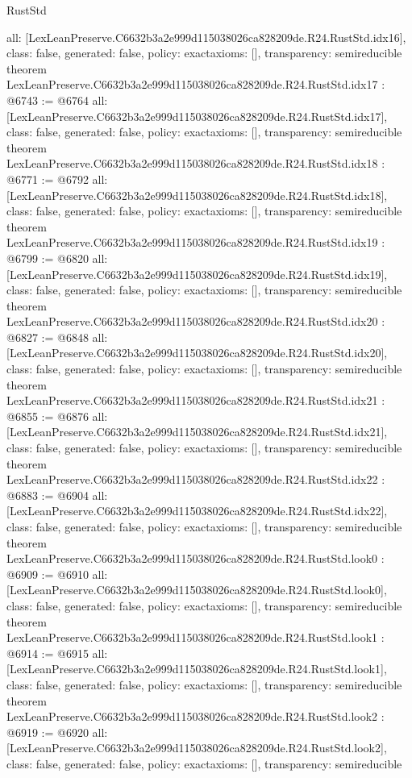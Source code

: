 \begin{lexlean}{RustStd}
\begin{coremodule}
{  all: [LexLeanPreserve.C6632b3a2e999d115038026ca828209de.R24.RustStd.idx16],
  class: false,
  generated: false,
  policy: exact{axioms: []},
  transparency: semireducible
}
theorem LexLeanPreserve.C6632b3a2e999d115038026ca828209de.R24.RustStd.idx17 : @6743 := @6764 {
  all: [LexLeanPreserve.C6632b3a2e999d115038026ca828209de.R24.RustStd.idx17],
  class: false,
  generated: false,
  policy: exact{axioms: []},
  transparency: semireducible
}
theorem LexLeanPreserve.C6632b3a2e999d115038026ca828209de.R24.RustStd.idx18 : @6771 := @6792 {
  all: [LexLeanPreserve.C6632b3a2e999d115038026ca828209de.R24.RustStd.idx18],
  class: false,
  generated: false,
  policy: exact{axioms: []},
  transparency: semireducible
}
theorem LexLeanPreserve.C6632b3a2e999d115038026ca828209de.R24.RustStd.idx19 : @6799 := @6820 {
  all: [LexLeanPreserve.C6632b3a2e999d115038026ca828209de.R24.RustStd.idx19],
  class: false,
  generated: false,
  policy: exact{axioms: []},
  transparency: semireducible
}
theorem LexLeanPreserve.C6632b3a2e999d115038026ca828209de.R24.RustStd.idx20 : @6827 := @6848 {
  all: [LexLeanPreserve.C6632b3a2e999d115038026ca828209de.R24.RustStd.idx20],
  class: false,
  generated: false,
  policy: exact{axioms: []},
  transparency: semireducible
}
theorem LexLeanPreserve.C6632b3a2e999d115038026ca828209de.R24.RustStd.idx21 : @6855 := @6876 {
  all: [LexLeanPreserve.C6632b3a2e999d115038026ca828209de.R24.RustStd.idx21],
  class: false,
  generated: false,
  policy: exact{axioms: []},
  transparency: semireducible
}
theorem LexLeanPreserve.C6632b3a2e999d115038026ca828209de.R24.RustStd.idx22 : @6883 := @6904 {
  all: [LexLeanPreserve.C6632b3a2e999d115038026ca828209de.R24.RustStd.idx22],
  class: false,
  generated: false,
  policy: exact{axioms: []},
  transparency: semireducible
}
theorem LexLeanPreserve.C6632b3a2e999d115038026ca828209de.R24.RustStd.look0 : @6909 := @6910 {
  all: [LexLeanPreserve.C6632b3a2e999d115038026ca828209de.R24.RustStd.look0],
  class: false,
  generated: false,
  policy: exact{axioms: []},
  transparency: semireducible
}
theorem LexLeanPreserve.C6632b3a2e999d115038026ca828209de.R24.RustStd.look1 : @6914 := @6915 {
  all: [LexLeanPreserve.C6632b3a2e999d115038026ca828209de.R24.RustStd.look1],
  class: false,
  generated: false,
  policy: exact{axioms: []},
  transparency: semireducible
}
theorem LexLeanPreserve.C6632b3a2e999d115038026ca828209de.R24.RustStd.look2 : @6919 := @6920 {
  all: [LexLeanPreserve.C6632b3a2e999d115038026ca828209de.R24.RustStd.look2],
  class: false,
  generated: false,
  policy: exact{axioms: []},
  transparency: semireducible
}
\end{coremodule}
\end{lexlean}

